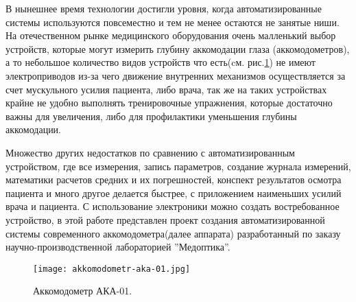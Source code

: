 В нынешнее время технологии достигли уровня, когда автоматизированные системы используются повсеместно и тем не менее остаются не занятые ниши. На отечественном рынке медицинского оборудования очень малленький выбор устройств, которые могут измерить глубину аккомодации глаза (аккомодометров), а то небольшое количество видов устройств что есть(cм. рис.\ref{fig:aka-01}) не имеют электроприводов из-за чего движение внутренних механизмов осуществляется за счет мускульного усилия пациента, либо врача, так же на таких устройствах крайне не удобно выполнять тренировочные упражнения, которые достаточно важны для увеличения, либо для профилактики уменьшения глубины аккомодации.

Множество других недостатков по сравнению с автоматизированным устройством, где все измерения, запись параметров, создание журнала измерений, математики расчетов средних и их погрешностей, конспект результатов осмотра пациента и много другое делается быстрее, с приложением наименьших усилий врача и пациента. С использование электроники можно создать востребованное устройство, в этой работе представлен проект создания автоматизированной системы современного аккомодометра(далее аппарата) разработанный по заказу научно-производственной лабораторией ''Медоптика''.
\begin{figure}[ht]
    \centering
    \texttt{[image: akkomodometr-aka-01.jpg]}
    \caption{Аккомодометр АКА-01.}
    \label{fig:aka-01}
\end{figure}	